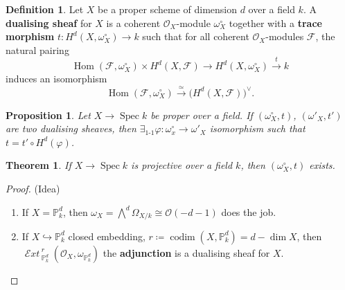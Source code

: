 \documentclass[12pt]{article}
\DeclareMathOperator{\Hom}{Hom}
\DeclareMathOperator{\Spec}{Spec}
\DeclareMathOperator{\codim}{codim}
\DeclareMathOperator{\shExt}{\mathcal{E}\textit{xt}\,}
\newtheorem*{proposition}{Proposition}
\newtheorem*{theorem}{Theorem}
\theoremstyle{definition}
\newtheorem*{definition}{Definition}
\theoremstyle{remark}
\begin{document}
\begin{definition}
Let $X$ be a proper scheme of dimension $d$ over a field $k$. A \textbf{dualising sheaf} for $X$ is a coherent $\mathcal{O}_X$-module $\omega_X^{\circ}$ together with a \textbf{trace morphism} $t:H^d(X,\omega_X^{\circ})\rightarrow k$ such that for all coherent $\mathcal{O}_X$-modules $\mathcal{F}$, the natural pairing
\[\Hom(\mathcal{F},\omega_X^{\circ})\times H^d(X,\mathcal{F})\longrightarrow H^d(X,\omega_X^{\circ})\overset{t}{\longrightarrow}k\]
induces an isomorphism
\[\Hom(\mathcal{F},\omega_X^{\circ})\overset{\simeq}{\longrightarrow}\big(H^d(X,\mathcal{F})\big)^{\vee}.\]
\end{definition}

\begin{proposition}
Let $X\rightarrow\Spec k$ be proper over a field. If $(\omega_X^{\circ},t)$, $(\omega'_X,t')$ are two dualising sheaves, then $\exists_{1\text{-}1}\varphi:\omega_x^{\circ}\rightarrow\omega'_X$ isomorphism such that $t=t'\circ H^d(\varphi)$.
\end{proposition}

\begin{theorem}
If $X\rightarrow\Spec k$ is projective over a field $k$, then $(\omega_X^{\circ},t)$ exists.
\end{theorem}

\begin{proof}
(Idea)
\begin{enumerate}[label=\arabic*)]
\item If $X=\mathbb{P}_k^d$, then $\omega_X=\bigwedge^d\Omega_{X/k}\cong\mathcal{O}(-d-1)$ does the job.

\item If $X\hookrightarrow\mathbb{P}_k^d$ closed embedding, $r\coloneqq\codim(X,\mathbb{P}_k^d)=d-\dim X$, then $\shExt_{\mathbb{P}_k^d}^r(\mathcal{O}_X,\omega_{\mathbb{P}_k^d})$ the \textbf{adjunction} is a dualising sheaf for $X$.
\end{enumerate}
\end{proof}
\end{document}
